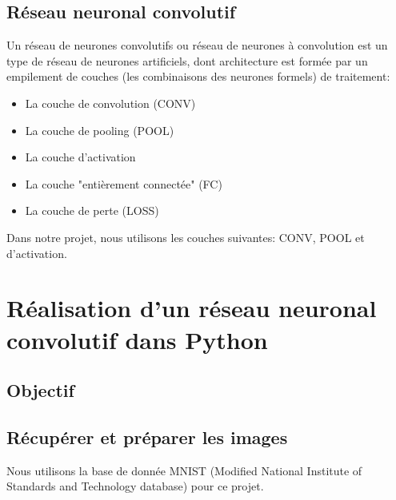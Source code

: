 \documentclass[12pt,a4paper]{article}
\begin{document}
\subsection{Réseau neuronal convolutif}
Un réseau de neurones convolutifs ou réseau de neurones à convolution
est un type de réseau de neurones artificiels, dont architecture est formée par
un empilement de couches (les combinaisons des neurones formels) de traitement:\cite{wiki-cnn}
\begin{itemize}
\item[\textbullet] La couche de convolution (CONV)
\item[\textbullet] La couche de pooling (POOL)
\item[\textbullet] La couche d'activation
\item[\textbullet] La couche "entièrement connectée" (FC)
\item[\textbullet] La couche de perte (LOSS)
\end{itemize}
Dans notre projet, nous utilisons les couches suivantes: CONV, POOL et d'activation.

\section{Réalisation d'un réseau neuronal convolutif dans Python}
\subsection{Objectif}
\subsection{Récupérer et préparer les images}
Nous utilisons la base de donnée MNIST (Modified National Institute of Standards and Technology database)
pour ce projet.
\end{document}
